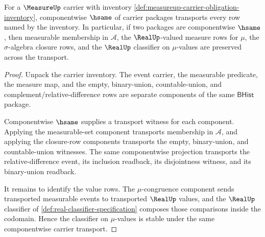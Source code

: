 \begin{theorem}
\label{thm:measureup-classifier-stability-obligations}
For a $\MeasureUp$ carrier with inventory
\autoref{def:measureup-carrier-obligation-inventory}, componentwise $\hsame$
of carrier packages transports every row named by the inventory. In particular,
if two packages are componentwise $\hsame$, then measurable membership in
$\mathcal{A}$, the $\RealUp$-valued measure rows for $\mu$, the
$\sigma$-algebra closure rows, and the $\RealUp$ classifier on $\mu$-values are
preserved across the transport.
\end{theorem}
\begin{proof}
Unpack the carrier inventory. The event carrier, the measurable predicate, the
measure map, and the empty, binary-union, countable-union, and
complement/relative-difference rows are separate components of the same
$\mathsf{BHist}$ package.

Componentwise $\hsame$ supplies a transport witness for each component. Applying
the measurable-set component transports membership in $\mathcal{A}$, and
applying the closure-row components transports the empty, binary-union, and
countable-union witnesses. The same componentwise projection transports the
relative-difference event, its inclusion readback, its disjointness witness,
and its binary-union readback.

It remains to identify the value rows. The $\mu$-congruence component sends
transported measurable events to transported $\RealUp$ values, and the
$\RealUp$ classifier of \autoref{def:real-classifier-specification} composes
those comparisons inside the codomain. Hence the classifier on $\mu$-values is
stable under the same componentwise carrier transport.
\end{proof}

